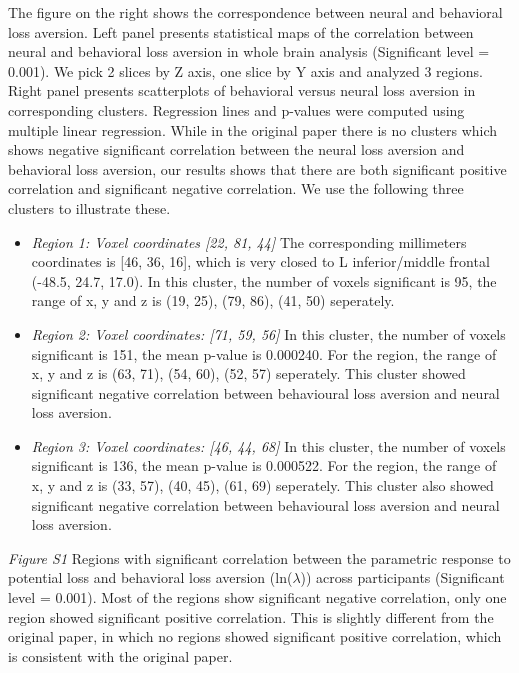 \documentclass[11pt]{article}
\begin{document}
The figure on the right shows the correspondence between neural and behavioral loss aversion. Left panel presents statistical maps of the correlation between neural and behavioral loss aversion in whole brain analysis (Significant level = 0.001). We pick 2 slices by Z axis, one slice by Y axis and analyzed 3 regions. Right panel presents scatterplots of behavioral versus neural loss aversion in corresponding clusters. Regression lines and p-values were computed using multiple linear regression. While in the original paper there is no clusters which shows negative significant correlation between the neural loss aversion and behavioral loss aversion, our results shows that there are both significant positive correlation and significant negative correlation. We use the following three clusters to illustrate these.

\begin{itemize}
\item \emph{Region 1: Voxel coordinates [22, 81, 44]} The corresponding millimeters coordinates is [46, 36, 16], which is very closed to L inferior/middle frontal (-48.5, 24.7, 17.0). In this cluster, the number of voxels significant is 95, the range of x, y and z is (19, 25), (79, 86), (41, 50) seperately.
\end{itemize}

\begin{itemize}
\item \emph{Region 2: Voxel coordinates: [71, 59, 56]} In this cluster, the number of voxels significant is 151, the mean p-value is 0.000240. For the region, the range of x, y and z is (63, 71), (54, 60), (52, 57) seperately. This cluster showed significant negative correlation between behavioural loss aversion and neural loss aversion.
\item \emph{Region 3: Voxel coordinates: [46, 44, 68]} In this cluster, the number of voxels significant is 136, the mean p-value is 0.000522. For the region, the range of x, y and z is (33, 57), (40, 45), (61, 69) seperately. This cluster also showed significant negative correlation between behavioural loss aversion and neural loss aversion.

\end{itemize}

\newpage

\emph{Figure S1} Regions with significant correlation between the parametric response to potential loss and behavioral loss aversion (ln($\lambda$)) across participants (Significant level = 0.001).  Most of the regions show significant negative correlation, only one region showed significant positive correlation. This is slightly different from the original paper, in which no regions showed significant positive correlation, which is consistent with the original paper.
\end{document}
